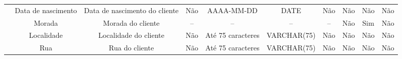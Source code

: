 \begin{table}[h]
{\begin{tabular}{|c|ccccccccc|}
                              & Data de nascimento                                                          & Data de nascimento do cliente                                                                                                          & Não                                                                                     & AAAA-MM-DD                                                                                                     & DATE                                                                                    & Não                                & Não                                      & Não                                    & Não               \\
                              & Morada                                                         & Morada do cliente                                                                                                         & --                                                                                      & --                                                                                                                & --                                                                                     & --                                 & Não                                      & Sim                                    & Não               \\
                              & Localidade                                                     & Localidade do cliente                                                                                                     & Não                                                                                     & Até 75 caracteres                                                                                                 & VARCHAR(75)                                                                            & Não                                & Não                                      & Não                                    & Não               \\
                              & Rua                                                            & Rua do cliente                                                                                                            & Não                                                                                     & Até 75 caracteres                                                                                                 & VARCHAR(75)                                                                            & Não                                & Não                                      & Não                                    & Não               \\

\end{tabular}}
\end{table}
